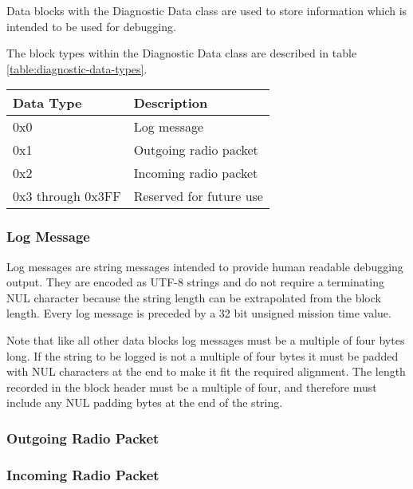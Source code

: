 Data blocks with the Diagnostic Data class are used to store information which
is intended to be used for debugging.

The block types within the Diagnostic Data class are described in table
\ref{table:diagnostic-data-types}.

\begin{table*}[htb]
\centering
\begin{tabular}{@{}ll@{}}
\toprule
Data Type           &   Description \\
\midrule
0x0                 &   Log message \\
0x1                 &   Outgoing radio packet \\
0x2                 &   Incoming radio packet \\
0x3 through 0x3FF   &   Reserved for future use \\
\bottomrule
\end{tabular}
\caption{Diagnostic data block types}
\label{table:diagnostic-data-types}
\end{table*}

\subsubsection{Log Message}

Log messages are string messages intended to provide human readable debugging
output. They are encoded as UTF-8 strings and do not require a terminating NUL
character because the string length can be extrapolated from the block length.
Every log message is preceded by a 32 bit unsigned mission time value.

Note that like all other data blocks log messages must be a multiple of four
bytes long. If the string to be logged is not a multiple of four bytes it must
be padded with NUL characters at the end to make it fit the required alignment.
The length recorded in the block header must be a multiple of four, and
therefore must include any NUL padding bytes at the end of the string.

\subsubsection{Outgoing Radio Packet}

\subsubsection{Incoming Radio Packet}

